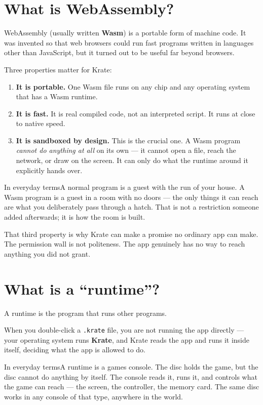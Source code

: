 \documentclass[11pt,a4paper]{report}
\newcommand{\analogy}[1]{\begin{plainbox}{In everyday terms}#1\end{plainbox}}
\begin{document}
\section{What is WebAssembly?}

WebAssembly (usually written \textbf{Wasm}) is a portable form of machine
code. It was invented so that web browsers could run fast programs written
in languages other than JavaScript, but it turned out to be useful far
beyond browsers.

Three properties matter for Krate:

\begin{enumerate}[leftmargin=*]
  \item \textbf{It is portable.} One Wasm file runs on any chip and any
    operating system that has a Wasm runtime.
  \item \textbf{It is fast.} It is real compiled code, not an interpreted
    script. It runs at close to native speed.
  \item \textbf{It is sandboxed by design.} This is the crucial one. A Wasm
    program \emph{cannot do anything at all} on its own --- it cannot open
    a file, reach the network, or draw on the screen. It can only do what
    the runtime around it explicitly hands over.
\end{enumerate}

\analogy{A normal program is a guest with the run of your house. A Wasm
program is a guest in a room with no doors --- the only things it can
reach are what you deliberately pass through a hatch. That is not a
restriction someone added afterwards; it is how the room is built.}

That third property is why Krate can make a promise no ordinary app can
make. The permission wall is not politeness. The app genuinely has no way
to reach anything you did not grant.

\section{What is a ``runtime''?}

A runtime is the program that runs other programs.

When you double-click a \texttt{.krate} file, you are not running the app
directly --- your operating system runs \textbf{Krate}, and Krate reads the
app and runs it inside itself, deciding what the app is allowed to do.

\analogy{A runtime is a games console. The disc holds the game, but the
disc cannot do anything by itself. The console reads it, runs it, and
controls what the game can reach --- the screen, the controller, the memory
card. The same disc works in any console of that type, anywhere in the
world.}
\end{document}
